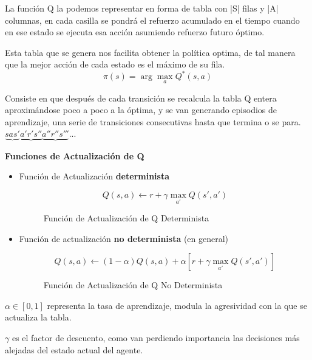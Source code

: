 \documentclass[12pt]{report} %
\begin{document}
La función Q la podemos representar en forma de tabla con |S| filas y |A| columnas, en cada casilla se pondrá el refuerzo acumulado en el tiempo cuando en ese estado se ejecuta esa acción asumiendo refuerzo futuro óptimo.

Esta tabla que se genera nos facilita obtener la política optima, de tal manera que la mejor acción de cada estado es el máximo de su fila.
$$\pi(s) = \arg \max _a Q^* (s,a)$$

Consiste en que después de cada transición se recalcula la tabla Q entera aproximándose poco a poco a la óptima, y se van generando episodios de aprendizaje, una serie de transiciones consecutivas hasta que termina o se para. $\underbrace{sas'} \underbrace{a'r's''} \underbrace{a''r''s'''}...$

\textbf{Funciones de Actualización de Q}
\begin{itemize}
  \item Función de Actualización \textbf{determinista}
  \begin{figure}[H]
    $$Q(s,a) \leftarrow r + \gamma \max_{a'} Q(s',a')$$

    \captionsetup{justification=centering}
    \caption{Función de Actualización de Q Determinista}
  \end{figure}
  \item Función de actualización \textbf{no determinista} (en general)
  \begin{figure}[H]
    $$Q(s,a) \leftarrow (1-\alpha) Q(s,a) + \alpha[r + \gamma \max_{a'} Q(s',a')]$$

    \captionsetup{justification=centering}
    \caption{Función de Actualización de Q No Determinista}
  \end{figure}
\end{itemize}

$\alpha \in [0,1]$ representa la tasa de aprendizaje, modula la agresividad con la que se actualiza la tabla.

$\gamma$ es el factor de descuento, como van perdiendo importancia las decisiones más alejadas del estado actual del agente.
\end{document}
